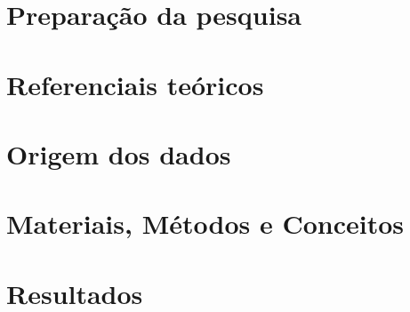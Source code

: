\documentclass[
	12pt,				%
	openright,			%
	oneside,			%
	a4paper,			%
	english,			%
	french,				%
	spanish,			%
	brazil				%
	]{abntex2}
\begin{document}


\textual




\part{Preparação da pesquisa}



\part{Referenciais teóricos}



\part{Origem dos dados}



\part{Materiais, Métodos e Conceitos}



\part{Resultados}
\end{document}
